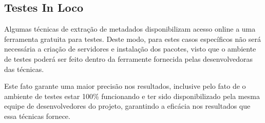 \subsection{Testes In Loco}
\label{ssec:in-loco-tests}


Algumas técnicas de extração de metadados disponibilizam acesso online a uma ferramenta gratuita para testes. Deste modo, para estes casos específicos não será necessária a criação de servidores e instalação dos pacotes, visto que o ambiente de testes poderá ser feito dentro da ferramente fornecida pelas desenvolvedoras das técnicas.


Este fato garante uma maior precisão nos resultados, inclusive pelo fato de o ambiente de testes estar 100\% funcionando e ter sido disponibilizado pela mesma equipe de desenvolvedores do projeto, garantindo a eficácia nos resultados que essa técnicas fornece.




